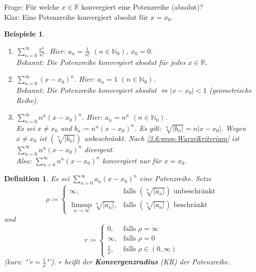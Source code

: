 \documentclass[12pt]{extreport} %
\newcommand{\N}{\mathbb{N}}
\newcommand{\R}{\mathbb{R}}
\theoremstyle{named}
\theoremstyle{itshape}
\newtheorem*{definition}{Definition}
\theoremstyle{normal}
\newtheorem*{beispiele}{Beispiele}
\begin{document}
Frage: Für welche $x \in \R$ konvergiert eine Potenzreihe (absolut)? \\
Klar: Eine Potenzreihe konvergiert absolut für $x = x_{0}$.

\begin{beispiele} ~\
	\begin{enumerate}
		\item $\sum_{n=0}^{\infty} \frac{x^{n}}{n!}$. Hier: $a_{n} = \frac{1}{n!}$ $(n \in \N_0)$, $x_{0} = 0$. \\
		Bekannt: Die Potenzreihe konvergiert absolut für jedes $x \in \R$.
		\item $\sum_{n=0}^{\infty} (x - x_{0})^{n}$. Hier: $a_{n} = 1$ $(n \in \N_0)$. \\
		Bekannt: Die Potenzreihe konvergiert absolut $\iff |x - x_{0} | < 1$ (geometrische Reihe).
			
		\item $\sum_{n=0}^{\infty} n^{n} (x - x_{0})^{n}$. Hier: $a_{n} = n^{n}$ $(n \in \N_0)$. \\
		Es sei $x \neq x_{0}$ und $b_{n} \coloneqq n^{n} (x - x_{0})^{n}$. Es gilt: $\sqrt[n]{|b_{n}|} = n |x - x_{0}|$. Wegen $x \neq x_{0}$ ist 
		$\left( \sqrt[n]{|b_{n}|} \right)$ unbeschränkt. Nach \ref{3.6:prop-Wurzelkriterium} ist $\sum_{n=0}^{\infty} n^{n} (x - x_{0})^{n}$ divergent. \\
		Also: $\sum_{n=0}^{\infty} n^{n} (x - x_{0})^{n}$ konvergiert nur für $x = x_{0}$.
	\end{enumerate}	
\end{beispiele}

\begin{definition}
	Es sei $\sum_{n=0}^{\infty} a_{n} (x - x_{0})^{n}$ eine Potenzreihe. Setze
		$$ \rho \coloneqq \begin{cases}
			\infty, & \text{falls } \left( \sqrt[n]{|a_{n}|} \right) \text{ unbeschränkt} \\
			\limsup_{n \to \infty} \sqrt[n]{|a_{n}|}, & \text{falls } \left( \sqrt[n]{|a_{n}|} \right) \text{ beschränkt}
		\end{cases} $$
	und
		$$ r \coloneqq \begin{cases}
			0, & \text{falls } \rho = \infty \\
			\infty, & \text{falls } \rho = 0 \\
			\frac{1}{\rho}, & \text{falls } \rho \in (0, \infty)
		\end{cases} $$
	(kurz: "'$r = \frac{1}{\rho}$"'). $r$ hei{\ss}t der \textbf{Konvergenzradius} (KR) der Potenzreihe.
\end{definition}
\end{document}
